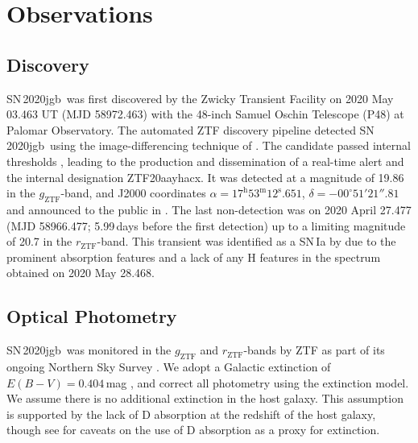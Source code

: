 \documentclass[twocolumn]{aastex631}
\newcommand{\sn}{SN\,2020jgb}
\newcommand{\chang}[1]{\textcolor{blue}{[Chang: #1]}}
\begin{document}
\section{Observations} \label{sec:obs}
\subsection{Discovery}


\sn\ was first discovered by the Zwicky Transient Facility \citep[ZTF;][]{ZTF2019a,ZTF2019b} on 2020 May 03.463 UT (MJD 58972.463) with the 48-inch Samuel Oschin Telescope (P48) at Palomar Observatory. The automated ZTF discovery pipeline \citep{Masci_2019} detected \sn\ using the image-differencing technique of \citet{Zackay_imagesub_2016}. The candidate passed internal thresholds \citep[e.g.,][]{Mahabal_ZTFML_2019, Duev_ZTFML_2019}, leading to the production and dissemination of a real-time alert \citep{Patterson_ZTFalert_2019} and the internal designation ZTF20aayhacx. It was detected at a magnitude of 19.86 in the $g_\mathrm{ZTF}$-band, and J2000 coordinates $\alpha=17^\mathrm{h}53^\mathrm{m}12^\mathrm{s}.651$, $\delta=-00^\circ51'21''.81$ and announced to the public in \citet{Fremling_report_2020}. The last non-detection was on 2020 April 27.477 (MJD 58966.477; 5.99\,days before the first detection) up to a limiting magnitude of 20.7 in the $r_\mathrm{ZTF}$-band. This transient was identified as a SN\,Ia by \citet{TNS_2020} due to the prominent  absorption features and a lack of any H features in the spectrum obtained on 2020 May 28.468.

\subsection{Optical Photometry}
\sn\ was monitored in the $g_\mathrm{ZTF}$ and $r_\mathrm{ZTF}$-bands by ZTF as part of its ongoing Northern Sky Survey \citep{ZTF2019a}. %
We adopt a Galactic extinction of $E(B-V)=0.404\,$mag \citep{Schlafly2011}, and correct all photometry using the \citet{Fitzpatrick1999} extinction model. We assume there is no additional extinction in the host galaxy. This assumption is supported by the lack of  D absorption at the redshift of the host galaxy, though see \citet{Poznanski_2011} for caveats on the use of  D absorption as a proxy for extinction. 
\end{document}
